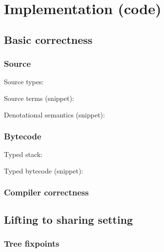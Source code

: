 \section{Implementation (code)}

    \subsection{Basic correctness}

        \begin{frame}[fragile]
            \frametitle{Source}

            Source types:

            Source terms (snippet):

            Denotational semantics (snippet):
\end{frame}

        \begin{frame}[fragile]
            \frametitle{Bytecode}

            Typed stack:

            Typed bytecode (snippet):
\end{frame}

        \begin{frame}
            \frametitle{Compiler correctness}
        \end{frame}


    \subsection{Lifting to sharing setting}
        \begin{frame}
            \frametitle{Tree fixpoints}

        \end{frame}

